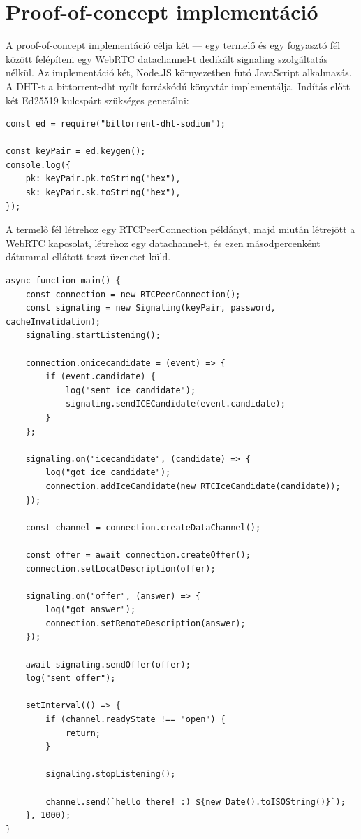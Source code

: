 \chapter{Proof-of-concept implementáció}\label{ch:proof-of-concept-implementáció}

A proof-of-concept implementáció célja két — egy termelő és egy fogyasztó fél között felépíteni egy WebRTC datachannel-t
dedikált signaling szolgáltatás nélkül.
Az implementáció két, Node.JS környezetben futó JavaScript alkalmazás.
A DHT-t a bittorrent-dht nyílt forráskódú könyvtár implementálja.
Indítás előtt két Ed25519 kulcspárt szükséges generálni:

\begin{lstlisting}[label={lst:lstlisting3}]
const ed = require("bittorrent-dht-sodium");

const keyPair = ed.keygen();
console.log({
    pk: keyPair.pk.toString("hex"),
    sk: keyPair.sk.toString("hex"),
});
\end{lstlisting}

A termelő fél létrehoz egy RTCPeerConnection példányt, majd miután létrejött a WebRTC kapcsolat, létrehoz egy datachannel-t,
és ezen másodpercenként dátummal ellátott teszt üzenetet küld.

\begin{lstlisting}[label={lst:lstlisting4}]
async function main() {
    const connection = new RTCPeerConnection();
    const signaling = new Signaling(keyPair, password, cacheInvalidation);
    signaling.startListening();

    connection.onicecandidate = (event) => {
        if (event.candidate) {
            log("sent ice candidate");
            signaling.sendICECandidate(event.candidate);
        }
    };

    signaling.on("icecandidate", (candidate) => {
        log("got ice candidate");
        connection.addIceCandidate(new RTCIceCandidate(candidate));
    });

    const channel = connection.createDataChannel();

    const offer = await connection.createOffer();
    connection.setLocalDescription(offer);

    signaling.on("offer", (answer) => {
        log("got answer");
        connection.setRemoteDescription(answer);
    });

    await signaling.sendOffer(offer);
    log("sent offer");

    setInterval(() => {
        if (channel.readyState !== "open") {
            return;
        }

        signaling.stopListening();

        channel.send(`hello there! :) ${new Date().toISOString()}`);
    }, 1000);
}
\end{lstlisting}

